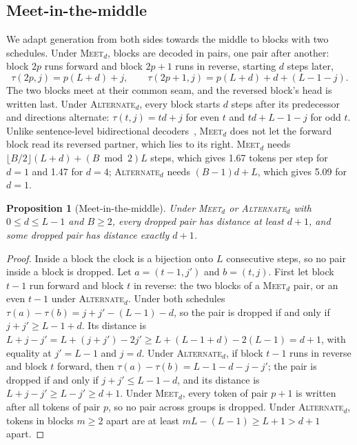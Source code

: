 \documentclass{article}
\newtheorem{proposition}{Proposition}
\theoremstyle{definition}
\theoremstyle{remark}
\newcommand{\name}[1]{\textup{\textsc{#1}}}
\newcommand{\meet}[1]{\name{Meet}$_{#1}$}
\newcommand{\alt}[1]{\name{Alternate}$_{#1}$}
\begin{document}
\subsection{Meet-in-the-middle}
\label{app:meet}

We adapt generation from both sides towards the middle to blocks with two schedules.
Under \meet{d}, blocks are decoded in pairs, one pair after another: block $2p$ runs forward and block $2p+1$ runs in reverse, starting $d$ steps later,
\begin{equation}
  \tau(2p,j)=p(L+d)+j,\qquad \tau(2p+1,j)=p(L+d)+d+(L-1-j).
  \label{eq:meet}
\end{equation}
The two blocks meet at their common seam, and the reversed block's head is written last.
Under \alt{d}, every block starts $d$ steps after its predecessor and directions alternate: $\tau(t,j)=td+j$ for even $t$ and $td+L-1-j$ for odd $t$.
Unlike sentence-level bidirectional decoders~\citep{zhou2019sbnmt,zhang2020interleaved}, \meet{d} does not let the forward block read its reversed partner, which lies to its right.
\meet{d} needs $\lfloor B/2\rfloor(L+d)+(B\bmod 2)L$ steps, which gives 1.67 tokens per step for $d=1$ and 1.47 for $d=4$; \alt{d} needs $(B-1)d+L$, which gives 5.09 for $d=1$.

\begin{proposition}[Meet-in-the-middle]
\label{prop:meet}
Under \meet{d} or \alt{d} with $0\le d\le L-1$ and $B\ge2$, every dropped pair has distance at least $d+1$, and some dropped pair has distance exactly $d+1$.
\end{proposition}

\begin{proof}
Inside a block the clock is a bijection onto $L$ consecutive steps, so no pair inside a block is dropped.
Let $a=(t-1,j')$ and $b=(t,j)$.
First let block $t-1$ run forward and block $t$ in reverse: the two blocks of a \meet{d} pair, or an even $t-1$ under \alt{d}.
Under both schedules $\tau(a)-\tau(b)=j+j'-(L-1)-d$, so the pair is dropped if and only if $j+j'\ge L-1+d$.
Its distance is $L+j-j'=L+(j+j')-2j'\ge L+(L-1+d)-2(L-1)=d+1$, with equality at $j'=L-1$ and $j=d$.
Under \alt{d}, if block $t-1$ runs in reverse and block $t$ forward, then $\tau(a)-\tau(b)=L-1-d-j-j'$; the pair is dropped if and only if $j+j'\le L-1-d$, and its distance is $L+j-j'\ge L-j'\ge d+1$.
Under \meet{d}, every token of pair $p+1$ is written after all tokens of pair $p$, so no pair across groups is dropped.
Under \alt{d}, tokens in blocks $m\ge2$ apart are at least $mL-(L-1)\ge L+1>d+1$ apart.
\end{proof}
\end{document}

